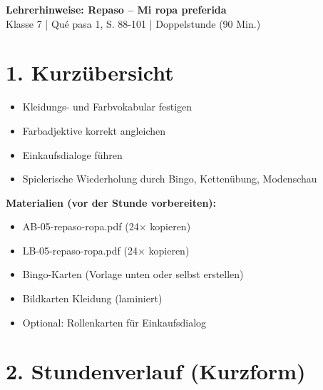 \documentclass[11pt, a4paper]{article}
\newcommand{\thema}{Repaso -- Mi ropa preferida}
\newcommand{\klasse}{7}
\newcommand{\lehrwerk}{Qué pasa 1, S. 88-101}
\begin{document}
\begin{center}
    {\Large\bfseries\textcolor{spanisch}{Lehrerhinweise: \thema}}\\[5pt]
    {\small Klasse \klasse{} | \lehrwerk{} | Doppelstunde (90 Min.)}
\end{center}

\vspace{10pt}


\section*{1. Kurzübersicht}

\begin{infobox}[Stundenziele]
\begin{itemize}[nosep, leftmargin=*]
    \item Kleidungs- und Farbvokabular festigen
    \item Farbadjektive korrekt angleichen
    \item Einkaufsdialoge führen
    \item Spielerische Wiederholung durch Bingo, Kettenübung, Modenschau
\end{itemize}
\end{infobox}

\vspace{5pt}

\textbf{Materialien (vor der Stunde vorbereiten):}
\begin{itemize}[nosep, leftmargin=*]
    \item AB-05-repaso-ropa.pdf (24× kopieren)
    \item LB-05-repaso-ropa.pdf (24× kopieren)
    \item Bingo-Karten (Vorlage unten oder selbst erstellen)
    \item Bildkarten Kleidung (laminiert)
    \item Optional: Rollenkarten für Einkaufsdialog
\end{itemize}


\section*{2. Stundenverlauf (Kurzform)}
\end{document}

